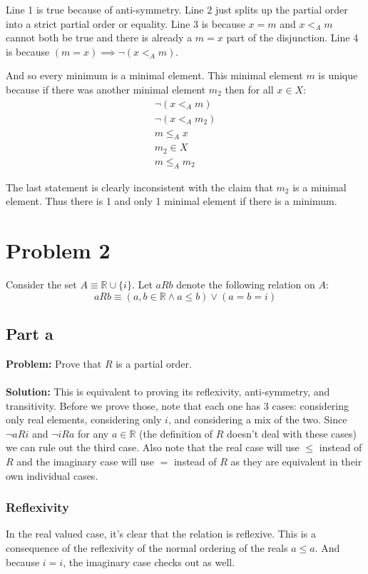 \documentclass{article}
\begin{document}
Line 1 is true because of anti-symmetry. Line 2 just splits up the partial order into a strict partial order or equality. Line 3 is because $x=m$ and $x<_Am$ cannot both be true and there is already a $m=x$ part of the disjunction. Line 4 is because $(m=x)\implies \neg(x<_Am)$.

And so every minimum is a minimal element. This minimal element $m$ is unique because if there was another minimal element $m_2$ then for all $x\in X$:
\begin{align*}
  \neg(x<_Am)\tag{$m$ is minimal}\\
  \neg(x<_Am_2)\tag{$m_2$ is minimal}\\
  m\le_Ax\tag{$m$ is a minimum}\\
  m_2\in X\\
  m\le_A m_2
\end{align*}

The last statement is clearly inconsistent with the claim that $m_2$ is a minimal element. Thus there is 1 and only 1 minimal element if there is a minimum.

\section*{Problem 2}
Consider the set $A\equiv\mathbb R\cup\{i\}$. Let $aRb$ denote the following relation on $A$:
$$aRb\equiv (a,b\in\mathbb R\wedge a\le b)\vee (a=b=i)$$

\subsection*{Part a}
\textbf{Problem:} Prove that $R$ is a partial order.
\\\\
\textbf{Solution:} This is equivalent to proving its reflexivity, anti-symmetry, and transitivity. Before we prove those, note that each one has 3 cases: considering only real elements, considering only $i$, and considering a mix of the two. Since $\neg aRi$ and $\neg iRa$ for any $a\in\mathbb R$ (the definition of $R$ doesn't deal with these cases) we can rule out the third case. Also note that the real case will use $\le$ instead of $R$ and the imaginary case will use $=$ instead of $R$ as they are equivalent in their own individual cases.

\subsubsection*{Reflexivity}
In the real valued case, it's clear that the relation is reflexive. This is a consequence of the reflexivity of the normal ordering of the reals $a\le a$. And because $i=i$, the imaginary case checks out as well.
\end{document}
